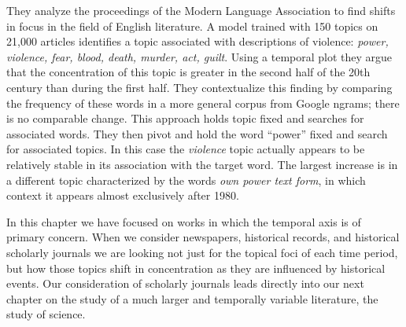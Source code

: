 They analyze the proceedings of the Modern Language Association to find shifts in focus in the field of English literature.
A model trained with 150 topics on 21,000 articles identifies a topic associated with descriptions of violence: {\em power,
violence, fear, blood, death, murder, act, guilt}. Using a temporal plot they argue that the concentration of this topic is greater in the second half of the 20th century than during the first half.
They contextualize this finding by comparing the frequency of these words in a more general corpus from Google ngrams; there is no comparable change.
This approach holds topic fixed and searches for associated words.
They then pivot and hold the word ``power'' fixed and search for associated topics.
In this case the {\em violence} topic actually appears to be relatively stable in its association with the target word. The largest increase is in a different topic characterized by the words {\em own power text form}, in which context it appears almost exclusively after 1980.

In this chapter we have focused on works in which the temporal axis is of primary concern.
When we consider newspapers, historical records, and historical scholarly journals we are looking not just for the topical foci of each time period, but how those topics shift in concentration as they are influenced by historical events.
Our consideration of scholarly journals leads directly into our next chapter on the study of a much larger and temporally variable literature, the study of science.
